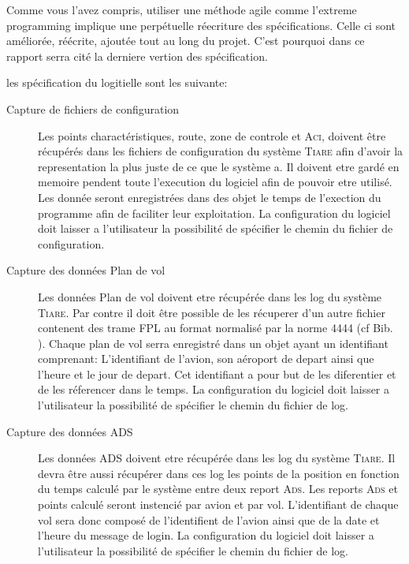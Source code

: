 

Comme vous l'avez compris, utiliser une méthode agile comme l'extreme programming  implique une perpétuelle réecriture des spécifications. Celle ci sont améliorée, réécrite, ajoutée tout au long du projet. C'est pourquoi dans ce rapport serra cité la derniere vertion des spécification.

les spécification du logitielle sont les suivante:
\begin{description}
    \item[Capture de fichiers de configuration] Les points charactéristiques, route, zone de controle et \textsc{Aci}, doivent être récupérés dans les fichiers de configuration du système \textsc{Tiare} afin d'avoir la representation la plus juste de ce que le système a. Il doivent etre gardé en memoire pendent toute l'execution du logiciel afin de pouvoir etre utilisé. Les donnée seront enregistrées dans des objet le temps de l'exection du programme afin de faciliter leur exploitation. La configuration du logiciel doit laisser a l'utilisateur la possibilité de spécifier le chemin du fichier de configuration.
    \item[Capture des données Plan de vol] Les données Plan de vol doivent etre récupérée dans les log du système \textsc{Tiare}. Par contre il doit être possible de les récuperer d'un autre fichier contenent des trame FPL au format normalisé par la norme 4444 (cf Bib. \cite{4444}). Chaque plan de vol serra enregistré dans un objet ayant un identifiant comprenant: L'identifiant de l'avion, son aéroport de depart ainsi que l'heure et le jour de depart. Cet identifiant a pour but de les diferentier et de les réferencer dans le temps. La configuration du logiciel doit laisser a l'utilisateur la possibilité de spécifier le chemin du fichier de log.
    \item[Capture des données \textsc{ADS}] Les données \textsc{ADS} doivent etre récupérée dans les log du système \textsc{Tiare}. Il devra être aussi récupérer dans ces log les points de la position en fonction du temps calculé par le système entre deux report \textsc{Ads}. Les reports \textsc{Ads} et points calculé seront instencié par avion et par vol. L'identifiant de chaque vol sera donc composé de l'identifient de l'avion ainsi que de la date et l'heure du message de login. La configuration du logiciel doit laisser a l'utilisateur la possibilité de spécifier le chemin du fichier de log.

\end{description}

